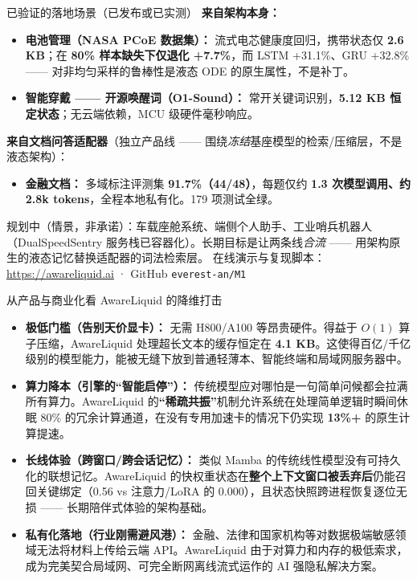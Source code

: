 ﻿\documentclass[aspectratio=169, 10pt]{beamer}
\begin{document}
\begin{frame}{已验证的落地场景（已发布或已实测）}
\small
\textbf{来自架构本身：}
\begin{itemize}\itemsep=0.4em
    \item \textbf{电池管理（NASA PCoE 数据集）：} 流式电芯健康度回归，携带状态仅 \textbf{2.6 KB}；在 \textbf{80\% 样本缺失下仅退化 +7.7\%}，而 LSTM +31.1\%、GRU +32.8\% —— 对非均匀采样的鲁棒性是液态 ODE 的原生属性，不是补丁。
    \item \textbf{智能穿戴 —— 开源唤醒词（O1-Sound）：} 常开关键词识别，\textbf{5.12 KB 恒定状态}；无云端依赖，MCU 级硬件毫秒响应。
\end{itemize}
\vspace{0.2em}
\textbf{来自文档问答适配器}（独立产品线 —— 围绕\emph{冻结}基座模型的检索/压缩层，不是液态架构）：
\begin{itemize}\itemsep=0.4em
    \item \textbf{金融文档：} 多域标注评测集 \textbf{91.7\%（44/48）}，每题仅约 \textbf{1.3 次模型调用、约 2.8k tokens}，全程本地私有化。179 项测试全绿。
\end{itemize}
\vspace{0.2em}
{\footnotesize 规划中（情景，非承诺）：车载座舱系统、端侧个人助手、工业哨兵机器人（DualSpeedSentry 服务栈已容器化）。长期目标是让两条线\emph{合流} —— 用架构原生的液态记忆替换适配器的词法检索层。}
\vspace{0.3em}
{\footnotesize 在线演示与复现脚本：\url{https://awareliquid.ai} · GitHub \texttt{everest-an/M1}}
\end{frame}

\begin{frame}[allowframebreaks]{从产品与商业化看 AwareLiquid 的降维打击}
\small
\begin{itemize}\itemsep=0.4em
    \item \textbf{极低门槛（告别天价显卡）：} 无需 H800/A100 等昂贵硬件。得益于 $O(1)$ 算子压缩，AwareLiquid 处理超长文本的缓存恒定在 \textbf{4.1 KB}。这使得百亿/千亿级别的模型能力，能被无缝下放到普通轻薄本、智能终端和局域网服务器中。
    \item \textbf{算力降本（引擎的“智能启停”）：} 传统模型应对哪怕是一句简单问候都会拉满所有算力。AwareLiquid 的\textbf{“稀疏共振”}机制允许系统在处理简单逻辑时瞬间休眠 80\% 的冗余计算通道，在没有专用加速卡的情况下仍实现 \textbf{13\%+} 的原生计算提速。
    \item \textbf{长线体验（跨窗口/跨会话记忆）：} 类似 Mamba 的传统线性模型没有可持久化的联想记忆。AwareLiquid 的快权重状态在\textbf{整个上下文窗口被丢弃后}仍能召回关键绑定（0.56 vs 注意力/LoRA 的 0.000），且状态快照跨进程恢复逐位无损 —— 长期陪伴式体验的架构基础。
    \item \textbf{私有化落地（行业刚需避风港）：} 金融、法律和国家机构等对数据极端敏感领域无法将材料上传给云端 API。AwareLiquid 由于对算力和内存的极低索求，成为完美契合局域网、可完全断网离线流式运作的 AI 强隐私解决方案。
\end{itemize}
\end{frame}
\end{document}
